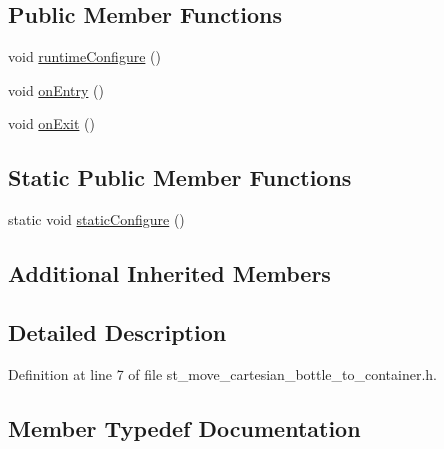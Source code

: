 \subsection*{Public Member Functions}
\begin{DoxyCompactItemize}
\item 
void \hyperlink{structsm__moveit__wine__serve_1_1StMoveCartesianBottleToContainer_abcc8f5de8340c93e8a45923fd511b76d}{runtime\+Configure} ()
\item 
void \hyperlink{structsm__moveit__wine__serve_1_1StMoveCartesianBottleToContainer_a79b8a9867db4956c3872d5ca4da7c93f}{on\+Entry} ()
\item 
void \hyperlink{structsm__moveit__wine__serve_1_1StMoveCartesianBottleToContainer_a395428baa679c2b752467c320dbdac0b}{on\+Exit} ()
\end{DoxyCompactItemize}
\subsection*{Static Public Member Functions}
\begin{DoxyCompactItemize}
\item 
static void \hyperlink{structsm__moveit__wine__serve_1_1StMoveCartesianBottleToContainer_a281ad74e2a197f5273b1b1105c7b671a}{static\+Configure} ()
\end{DoxyCompactItemize}
\subsection*{Additional Inherited Members}


\subsection{Detailed Description}


Definition at line 7 of file st\+\_\+move\+\_\+cartesian\+\_\+bottle\+\_\+to\+\_\+container.\+h.



\subsection{Member Typedef Documentation}
\mbox{\label{structsm__moveit__wine__serve_1_1StMoveCartesianBottleToContainer_a2350684d3e94c8b2713c13a0ecc73de8}} 
